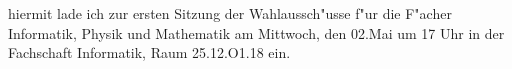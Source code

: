 \documentclass[12pt, german]{g-brief}
\begin{document}
\begin{g-brief}
hiermit lade ich zur ersten Sitzung der Wahlaussch"usse f"ur die F"acher Informatik, Physik und Mathematik am Mittwoch, den 02.Mai um 17 Uhr in der Fachschaft Informatik, Raum 25.12.O1.18 ein.

\end{g-brief}
\end{document}
